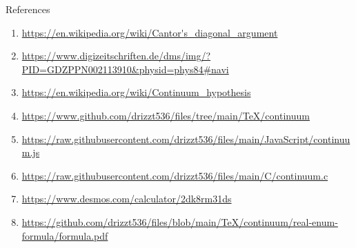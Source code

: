 \documentclass[12pt]{article}
\begin{document}
\pagebreak\begin{section}{References}\label{sec:references}
	\begin{enumerate}
		\item\url{https://en.wikipedia.org/wiki/Cantor's\_diagonal\_argument}\\
		\label{ref:diagonal argument}

		\item\url{https://www.digizeitschriften.de/dms/img/?PID=GDZPPN002113910&physid=phys84#navi}\\
		\label{ref:cantor-1891}

		\item\url{https://en.wikipedia.org/wiki/Continuum\_hypothesis}\\
		\label{ref:continuum}

		\item\url{https://www.github.com/drizzt536/files/tree/main/TeX/continuum}\\
		\label{ref:files}

		\item\url{https://raw.githubusercontent.com/drizzt536/files/main/JavaScript/continuum.js}\\
		\label{ref:js-code}

		\item\url{https://raw.githubusercontent.com/drizzt536/files/main/C/continuum.c}\\
		\label{ref:c-code}

		\item\url{https://www.desmos.com/calculator/2dk8rm31ds}\\
		\label{ref:desmos real-enum}

		\item
		\url{https://github.com/drizzt536/files/blob/main/TeX/continuum/real-enum-formula/formula.pdf}\\
		\label{ref:pdf real-enum}


\end{enumerate}
\end{section}
\end{document}
